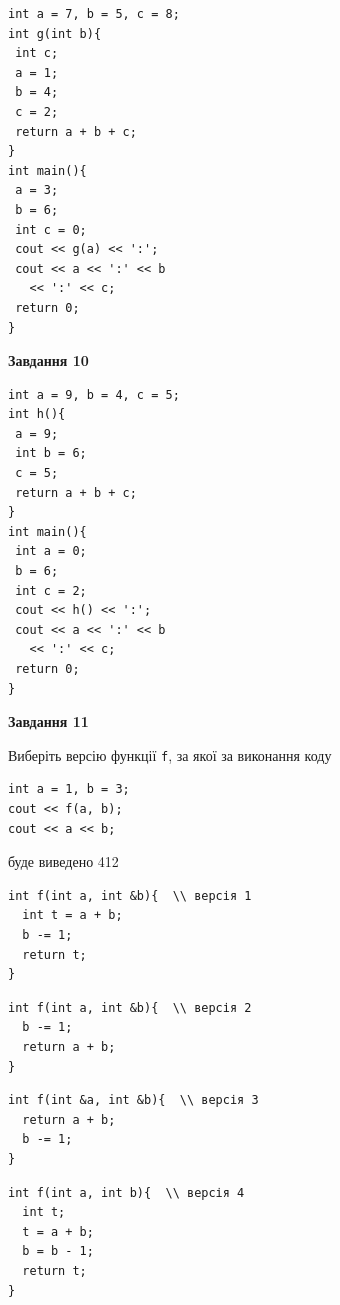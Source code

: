 \documentclass[12pt, ukrainian]{article}
\def\code#1{\Verb!#1!}
\begin{document}
{\begin {large}
\begin{minipage}[t]{7.0cm}
\begin{verbatim}
int a = 7, b = 5, c = 8;
int g(int b){
 int c;
 a = 1;
 b = 4;
 c = 2;
 return a + b + c;
}
int main(){
 a = 3;
 b = 6;
 int c = 0;
 cout << g(a) << ':';
 cout << a << ':' << b 
   << ':' << c;
 return 0;
}
\end{verbatim}



\begin{center}
\textbf{Завдання 10}
\end{center}
\vspace{-8mm}

\begin{verbatim}
int a = 9, b = 4, c = 5;
int h(){
 a = 9;
 int b = 6;
 c = 5;
 return a + b + c;
}
int main(){
 int a = 0;
 b = 6;
 int c = 2;
 cout << h() << ':';
 cout << a << ':' << b 
   << ':' << c;
 return 0;
}
\end{verbatim}

\end{minipage}
\vline \hspace{1mm}
\begin{minipage}[t]{11.0cm}

\begin{center}
\textbf{Завдання 11}
\end{center}
Виберіть версію функції \code{f}, за якої за виконання коду
\begin{verbatim}
int a = 1, b = 3;
cout << f(a, b);
cout << a << b;
\end{verbatim}

буде виведено 412

\begin{verbatim}
int f(int a, int &b){  \\ версія 1
  int t = a + b;
  b -= 1;
  return t;
}
\end{verbatim}

\vspace{-8mm}\begin{verbatim}
int f(int a, int &b){  \\ версія 2
  b -= 1;
  return a + b;
}
\end{verbatim}

\vspace{-8mm}\begin{verbatim}
int f(int &a, int &b){  \\ версія 3
  return a + b;
  b -= 1;
}
\end{verbatim}

\vspace{-8mm}\begin{verbatim}
int f(int a, int b){  \\ версія 4
  int t;
  t = a + b;
  b = b - 1;
  return t;
}
\end{verbatim}




\end{minipage}
\end{large}}
\end{document}
